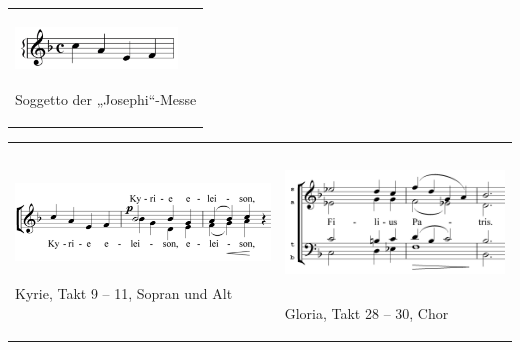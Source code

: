 \begin{center}
\begin{minipage}{4.736cm}
\begin{flushleft}
\tablefirsthead{}
\tablehead{}
\tabletail{}
\tablelasttail{}
\begin{supertabular}{m{4.5360003cm}}

\includegraphics[width=4.307cm,height=1.233cm]{pictures/zulassungsarbeit-img108.png}

Soggetto der „Josephi“-Messe\\
\end{supertabular}
\end{flushleft}
\end{minipage}
\end{center}
\begin{flushleft}
\tablefirsthead{}
\tablehead{}
\tabletail{}
\tablelasttail{}
\begin{supertabular}{m{8.196cm}m{7.783cm}}

\includegraphics[width=7.678cm,height=2.325cm]{pictures/zulassungsarbeit-img109.png}

Kyrie, Takt 9 – 11, Sopran und Alt &

\includegraphics[width=6.592cm,height=3.339cm]{pictures/zulassungsarbeit-img110.png}

Gloria, Takt 28 – 30, Chor\\
\end{supertabular}
\end{flushleft}
